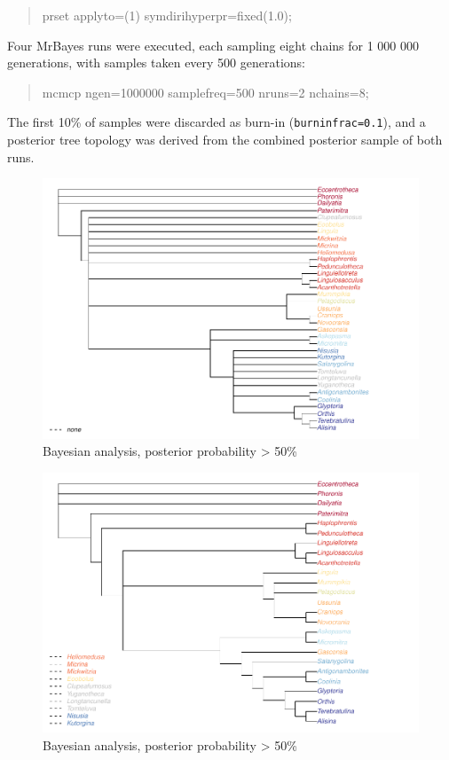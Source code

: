 \documentclass[]{book}
\theoremstyle{definition}
\theoremstyle{definition}
\theoremstyle{definition}
\theoremstyle{remark}
\begin{document}
\begin{quote}
prset applyto=(1) symdirihyperpr=fixed(1.0);
\end{quote}

Four MrBayes runs were executed, each sampling eight chains for 1 000
000 generations, with samples taken every 500 generations:

\begin{quote}
mcmcp ngen=1000000 samplefreq=500 nruns=2 nchains=8;
\end{quote}

The first 10\% of samples were discarded as burn-in
(\texttt{burninfrac=0.1}), and a posterior tree topology was derived
from the combined posterior sample of both runs.

\begin{figure}
\centering
\includegraphics{Brachiopod_phylogeny_files/figure-latex/unnamed-chunk-14-1.pdf}
\caption{\label{fig:unnamed-chunk-14}Bayesian analysis, posterior
probability \textgreater{} 50\%}
\end{figure}

\begin{figure}
\centering
\includegraphics{Brachiopod_phylogeny_files/figure-latex/unnamed-chunk-15-1.pdf}
\caption{\label{fig:unnamed-chunk-15}Bayesian analysis, posterior
probability \textgreater{} 50\%}
\end{figure}
\end{document}
